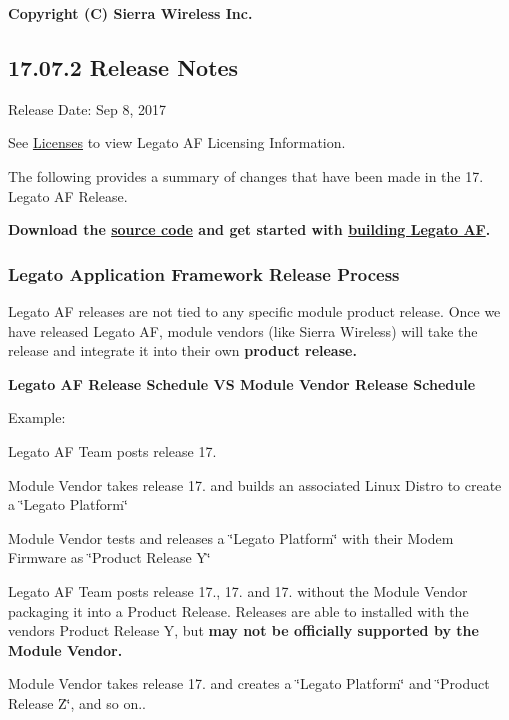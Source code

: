 {\bfseries Copyright (C) Sierra Wireless Inc. }\hypertarget{releaseNotes17072}{}\subsection{17.07.2 Release Notes}\label{releaseNotes17072}
Release Date\+: Sep 8, 2017

See \hyperlink{aboutLicenses}{Licenses} to view Legato AF Licensing Information.

The following provides a summary of changes that have been made in the 17. Legato AF Release.

{\bfseries  Download the \hyperlink{aboutReleaseInfo}{source code} and get started with \hyperlink{basicBuild}{building Legato AF}. }\hypertarget{releaseNotes17072_rn17_07_ReleaseNotes}{}\subsubsection{Legato Application Framework Release Process}\label{releaseNotes17072_rn17_07_ReleaseNotes}
Legato AF releases are not tied to any specific module product release. Once we have released Legato AF, module vendors (like Sierra Wireless) will take the release and integrate it into their own {\bfseries  product release. }

{\bfseries  Legato AF Release Schedule VS Module Vendor Release Schedule }



Example\+:
\begin{DoxyItemize}
\item Legato AF Team posts release 17.
\item Module Vendor takes release 17. and builds an associated Linux Distro to create a \char`\"{}\+Legato
   Platform\char`\"{}
\item Module Vendor tests and releases a \char`\"{}\+Legato Platform\char`\"{} with their Modem Firmware as \char`\"{}\+Product
   Release Y\char`\"{}
\item Legato AF Team posts release 17., 17. and 17. without the Module Vendor packaging it into a Product Release. Releases are able to installed with the vendor\textquotesingle{}s Product Release Y, but {\bfseries  may not be officially supported by the Module Vendor. }
\item Module Vendor takes release 17. and creates a \char`\"{}\+Legato Platform\char`\"{} and \char`\"{}\+Product Release Z\char`\"{}, and so on..
\end{DoxyItemize}

